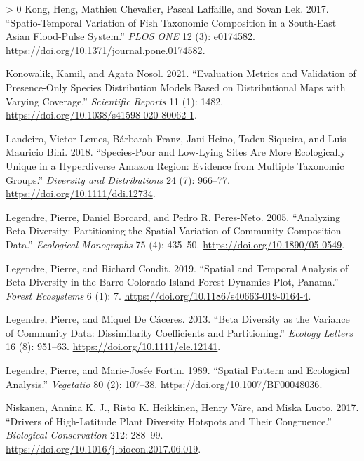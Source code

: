 \documentclass[11pt]{article}
\newlength{\cslhangindent}
\newenvironment{CSLReferences}[3] %
 {%
  \setlength{\parindent}{0pt}
  \ifodd #1 \everypar{\setlength{\hangindent}{\cslhangindent}}\ignorespaces\fi
  \ifnum #2 > 0
  \setlength{\parskip}{#2\baselineskip}
  \fi
 }%
 {}
\begin{document}
\begin{CSLReferences}{1}{0}
\leavevmode\hypertarget{ref-Kong2017SpaVar}{}%
Kong, Heng, Mathieu Chevalier, Pascal Laffaille, and Sovan Lek. 2017.
{``Spatio-Temporal Variation of Fish Taxonomic Composition in a
South-East Asian Flood-Pulse System.''} \emph{PLOS ONE} 12 (3):
e0174582. \url{https://doi.org/10.1371/journal.pone.0174582}.

\leavevmode\hypertarget{ref-Konowalik2021EvaMet}{}%
Konowalik, Kamil, and Agata Nosol. 2021. {``Evaluation Metrics and
Validation of Presence-Only Species Distribution Models Based on
Distributional Maps with Varying Coverage.''} \emph{Scientific Reports}
11 (1): 1482. \url{https://doi.org/10.1038/s41598-020-80062-1}.

\leavevmode\hypertarget{ref-Landeiro2018SpeLow}{}%
Landeiro, Victor Lemes, Bárbarah Franz, Jani Heino, Tadeu Siqueira, and
Luis Mauricio Bini. 2018. {``Species-Poor and Low-Lying Sites Are More
Ecologically Unique in a Hyperdiverse Amazon Region: Evidence from
Multiple Taxonomic Groups.''} \emph{Diversity and Distributions} 24 (7):
966--77. \url{https://doi.org/10.1111/ddi.12734}.

\leavevmode\hypertarget{ref-Legendre2005AnaBet}{}%
Legendre, Pierre, Daniel Borcard, and Pedro R. Peres-Neto. 2005.
{``Analyzing Beta Diversity: Partitioning the Spatial Variation of
Community Composition Data.''} \emph{Ecological Monographs} 75 (4):
435--50. \url{https://doi.org/10.1890/05-0549}.

\leavevmode\hypertarget{ref-Legendre2019SpaTem}{}%
Legendre, Pierre, and Richard Condit. 2019. {``Spatial and Temporal
Analysis of Beta Diversity in the Barro Colorado Island Forest Dynamics
Plot, Panama.''} \emph{Forest Ecosystems} 6 (1): 7.
\url{https://doi.org/10.1186/s40663-019-0164-4}.

\leavevmode\hypertarget{ref-Legendre2013BetDiv}{}%
Legendre, Pierre, and Miquel De Cáceres. 2013. {``Beta Diversity as the
Variance of Community Data: Dissimilarity Coefficients and
Partitioning.''} \emph{Ecology Letters} 16 (8): 951--63.
\url{https://doi.org/10.1111/ele.12141}.

\leavevmode\hypertarget{ref-Legendre1989SpaPat}{}%
Legendre, Pierre, and Marie-Josée Fortin. 1989. {``Spatial Pattern and
Ecological Analysis.''} \emph{Vegetatio} 80 (2): 107--38.
\url{https://doi.org/10.1007/BF00048036}.

\leavevmode\hypertarget{ref-Niskanen2017DriHig}{}%
Niskanen, Annina K. J., Risto K. Heikkinen, Henry Väre, and Miska Luoto.
2017. {``Drivers of High-Latitude Plant Diversity Hotspots and Their
Congruence.''} \emph{Biological Conservation} 212: 288--99.
\url{https://doi.org/10.1016/j.biocon.2017.06.019}.


\end{CSLReferences}
\end{document}
